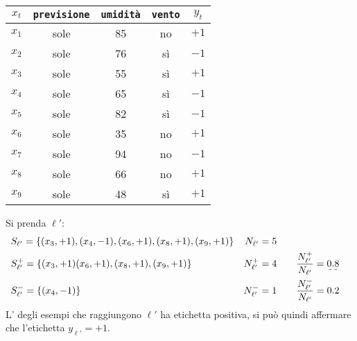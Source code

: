 \vspace{.7em}
\begin{minipage}{.49\textwidth}
    \captionsetup{type=table}
    \begin{center}
        \begin{tabular}{|c|c|c|c|c|} \hline
            $x_t$ & \texttt{previsione} & \texttt{umidità} & \texttt{vento} & $y_t$ \\ \hline
            \rowcolor{orange!40}$x_1$ & sole & 85 & no & $+1$\\
            \rowcolor{orange!40}$x_2$ & sole & 76 & sì & $-1$\\
            \rowcolor{cyan!40}  $x_3$ & sole & 55 & sì & $+1$\\
            \rowcolor{cyan!40}  $x_4$ & sole & 65 & sì & $-1$\\
            \rowcolor{orange!40}$x_5$ & sole & 82 & sì & $-1$\\
            \rowcolor{cyan!40}  $x_6$ & sole & 35 & no & $+1$\\
            \rowcolor{orange!40}$x_7$ & sole & 94 & no & $-1$\\
            \rowcolor{cyan!40}  $x_8$ & sole & 66 & no & $+1$\\
            \rowcolor{cyan!40}  $x_9$ & sole & 48 & sì & $+1$\\ \hline
        \end{tabular}
    \end{center}
\end{minipage}
\begin{minipage}{.49\textwidth}
    \captionsetup{type=figure}
    \centering
    
\end{minipage}

Si prenda $\ell'$:
$$
\begin{aligned}
    &S_{\ell'} = \{ (x_3,+1),(x_4,-1),(x_6,+1),(x_8,+1),(x_9,+1) \} & N_{\ell'}=5 \\
    &S_{\ell'}^+ = \{ (x_3,+1)(x_6,+1),(x_8,+1),(x_9,+1) \} & \NlposOne=4 
        & \qquad \frac{\NlposOne}{N_{\ell'}}=\dashuline{0.8} \\
    &S_{\ell'}^- = \{ (x_4,-1) \} & \NlnegOne=1 & \qquad \frac{\NlnegOne}{N_{\ell'}}=0.2 \\
\end{aligned}
$$
L' degli esempi che raggiungono $\ell'$ ha etichetta positiva, si può quindi
affermare che l'etichetta $y_{\ell'}=+1$.


